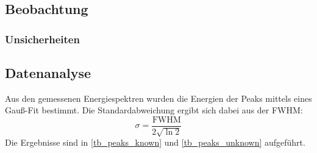 \documentclass[
	a4paper,
	12pt,
	pagesize,
	ngerman
]{scrartcl}
\begin{document}
	\subsection{Beobachtung}
	\subsubsection{Unsicherheiten} %
	\subsection{Datenanalyse}
	Aus den gemessenen Energiespektren wurden die Energien der Peaks mittels eines Gauß-Fit bestimmt.
	Die Standardabweichung ergibt sich dabei aus der FWHM:
	\begin{equation}
		\sigma = \frac{\text{FWHM}}{2\sqrt{\ln 2}}
	\end{equation}
	Die Ergebnisse sind in \cref{tb_peaks_known} und \cref{tb_peaks_unknown} aufgeführt.
	
	
\end{document}
